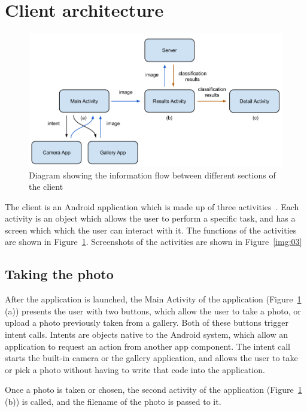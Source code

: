 \documentclass[11pt, a4paper]{report}
\begin{document}
\section{Client architecture} 

\begin{figure}[h]
	\centering
  \includegraphics[totalheight=9cm]{img/12.png}
  \caption{Diagram showing the information flow between different sections of the client}
  \label{img:12}
\end{figure}

The client is an Android application which is made up of three activities~\cite{AndroidDev:Activity}. Each activity is an object which allows the user to perform a specific task, and has a screen which which the user can interact with it. The functions of the activities are shown in Figure~\ref{img:12}. Screenshots of the activities are shown in Figure~\ref{img:03} 



\subsection{Taking the photo}

After the application is launched, the Main Activity of the application (Figure~\ref{img:12} (a)) presents the user with two buttons, which allow the user to take a photo, or upload a photo previously taken from a gallery. Both of these buttons trigger intent calls. Intents are objects native to the Android system, which allow an application to request an action from another app component. The intent call starts the built-in camera or the gallery application, and allows the user to take or pick a photo without having to write that code into the application. 

Once a photo is taken or chosen, the second activity of the application (Figure~\ref{img:12} (b)) is called, and the filename of the photo is passed to it. 
\end{document}
